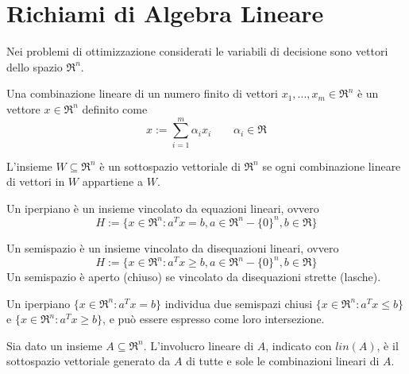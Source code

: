 \chapter{Richiami di Algebra Lineare}
\label{chp:foundations-linear-algebra}
Nei problemi di ottimizzazione considerati le variabili di decisione sono vettori dello spazio $\Re^{n}$.

\begin{definition}
	\label{dfn:linear-combination}
	Una combinazione lineare di un numero finito di vettori $x_{1},...,x_{m} \in\Re^{n}$ è un vettore $x\in\Re^{n}$ definito come
	\begin{equation}
	\label{eqn:linear-combination}
	x:=\sum_{i=1}^{m}\alpha_{i}x_{i} \qquad \alpha_{i}\in\Re
	\end{equation}
\end{definition}

\begin{definition}
	\label{dfn:vectorial-subspace}
	L'insieme $W\subseteq\Re^{n}$ è un sottospazio vettoriale di $\Re^{n}$ se ogni combinazione lineare di vettori in $W$ appartiene a $W$.
\end{definition}

\begin{definition}[Iperpiano]
	\label{dfn:hyperplan}
	Un iperpiano è un insieme vincolato da equazioni lineari, ovvero
	\begin{equation}
	\label{eqn:hyperplan}
	H:=\{x\in\Re^{n}:a^{T}x=b,a\in\Re^{n}-\{0\}^{n},b\in\Re\}
	\end{equation}
\end{definition}

\begin{definition}[Semispazio]
	\label{dfn:semispace}
	Un semispazio è un insieme vincolato da disequazioni lineari, ovvero
	\begin{equation}
	\label{eqn:semispace}
	H:=\{x\in\Re^{n}:a^{T}x\geq b,a\in\Re^{n}-\{0\}^{n},b\in\Re\}
	\end{equation}
	Un semispazio è aperto (chiuso) se vincolato da disequazioni strette (lasche).
\end{definition}

Un iperpiano $\{x\in\Re^{n}:a^{T}x=b\}$ individua due semispazi chiusi $\{x\in\Re^{n}:a^{T}x\leq b\}$ e $\{x\in\Re^{n}:a^{T}x\geq b\}$, e può essere espresso come loro intersezione.

\begin{definition}
	\label{dfn:linear-involucro}
	Sia dato un insieme $A\subseteq\Re^{n}$. L'involucro lineare di $A$, indicato con $lin(A)$, è il sottospazio vettoriale generato da $A$ di tutte e sole le combinazioni lineari di $A$.
\end{definition}

